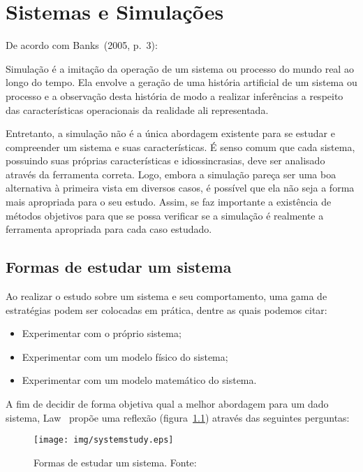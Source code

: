 \chapter{\label{chap:simulation}Sistemas e Simulações}

De acordo com Banks~(2005, p.~3):

\begin{directcite}
Simulação é a imitação da operação de um sistema ou processo do mundo real ao
longo do tempo. Ela envolve a geração de uma história artificial de um sistema
ou processo e a observação desta história de modo a realizar inferências a
respeito das características operacionais da realidade ali representada.
\end{directcite}

Entretanto, a simulação não é a única abordagem existente para se estudar e
compreender um sistema e suas características. É senso comum que cada sistema,
possuindo suas próprias características e idiossincrasias, deve ser analisado
através da ferramenta correta. Logo, embora a simulação pareça ser uma boa
alternativa à primeira vista em diversos casos, é possível que ela não seja a
forma mais apropriada para o seu estudo. Assim, se faz importante a existência
de métodos objetivos para que se possa verificar se a simulação é realmente a
ferramenta apropriada para cada caso estudado.

\section{\label{chap:waystostudy}Formas de estudar um sistema}

Ao realizar o estudo sobre um sistema e seu comportamento, uma gama de
estratégias podem ser colocadas em prática, dentre as quais podemos citar:

\begin{itemize}
\item Experimentar com o próprio sistema;
\item Experimentar com um modelo físico do sistema;
\item Experimentar com um modelo matemático do sistema.
\end{itemize}

A fim de decidir de forma objetiva qual a melhor abordagem para um dado sistema,
Law~\cite{Law} propõe uma reflexão (figura~\ref{fig:systemstudy}) através das
seguintes perguntas:

\begin{figure}[htb!]
\centering\texttt{[image: img/systemstudy.eps]}
\caption[Formas de estudar um sistema]{\label{fig:systemstudy}Formas de estudar um sistema. Fonte:~\cite{Law}}
\end{figure}

